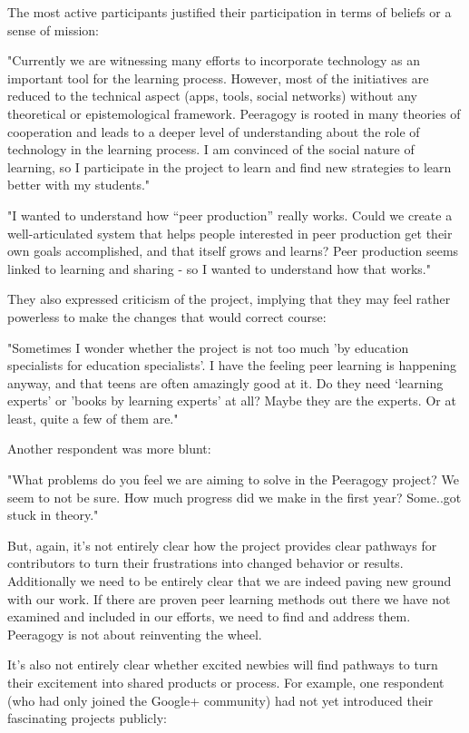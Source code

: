\documentclass{acm_proc_article-sp}
\begin{document}
The most active participants justified their participation in terms of beliefs or a sense of mission:

"Currently we are witnessing many efforts to incorporate technology as an important tool for the learning process. However, most of the initiatives are reduced to the technical aspect (apps, tools, social networks) without any theoretical or epistemological framework. Peeragogy is rooted in many theories of cooperation and leads to a deeper level of understanding about the role of technology in the learning process. I am convinced of the social nature of learning, so I participate in the project to learn and find new strategies to learn better with my students."

"I wanted to understand how ``peer production'' really works. Could we create a well-articulated system that helps people interested in peer production get their own goals accomplished, and that itself grows and learns? Peer production seems linked to learning and sharing - so I wanted to understand how that works."

They also expressed criticism of the project, implying that they may feel rather powerless to make the changes that would correct course:

"Sometimes I wonder whether the project is not too much 'by education specialists for education specialists'. I have the feeling peer learning is happening anyway, and that teens are often amazingly good at it. Do they need `learning experts' or 'books by learning experts' at all? Maybe they are the experts. Or at least, quite a few of them are."

Another respondent was more blunt:

"What problems do you feel we are aiming to solve in the Peeragogy project? We seem to not be sure. How much progress did we make in the first year? Some..got stuck in theory."

But, again, it's not entirely clear how the project provides clear pathways for contributors to turn their frustrations into changed behavior or results. Additionally we need to be entirely clear that we are indeed paving new ground with our work. If there are proven peer learning methods out there we have not examined and included in our efforts, we need to find and address them. Peeragogy is not about reinventing the wheel.

It's also not entirely clear whether excited newbies will find pathways to turn their excitement into shared products or process. For example, one respondent (who had only joined the Google+ community) had not yet introduced their fascinating projects publicly:
\end{document}
